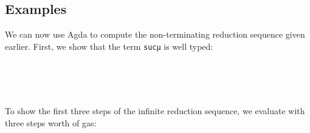 \hypertarget{examples}{%
\subsection{Examples}\label{examples}}

We can now use Agda to compute the non-terminating reduction sequence
given earlier. First, we show that the term \texttt{sucμ} is well typed:

\begin{fence}
\begin{code}%
\>[0]\AgdaSpace{}%
\AgdaSymbol{:}\AgdaSpace{}%
\AgdaSpace{}%
\AgdaSpace{}%
\AgdaSpace{}%
\AgdaSpace{}%
\AgdaSpace{}%
\AgdaSpace{}%
\AgdaSpace{}%
\AgdaSpace{}%
\AgdaSpace{}%
\<%
\\
\>[0]\AgdaSpace{}%
\AgdaSymbol{=}\AgdaSpace{}%
\AgdaSpace{}%
\AgdaSymbol{(}\AgdaSpace{}%
\AgdaSymbol{(}\AgdaSpace{}%
\AgdaSymbol{))}\<%
\\
\>[0][@{}l@{\AgdaIndent{0}}]%
\>[2]\<%
\\
%
\>[2]\AgdaSpace{}%
\AgdaSymbol{=}\AgdaSpace{}%
\<%
\end{code}
\end{fence}

To show the first three steps of the infinite reduction sequence, we
evaluate with three steps worth of gas:

